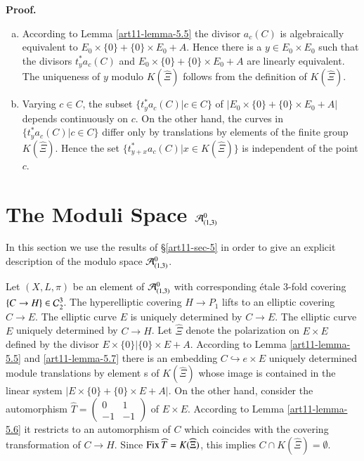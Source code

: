 \medskip
\noindent
{\bfseries Proof.}

\begin{enumerate}[a)]
\item According to Lemma \ref{art11-lemma-5.5} the divisor $a_{c}(C)$ is algebraically equivalent to $E_{0} \times \{0\} + \{0\} \times E_{0} + A$. Hence there is a $y \in E_{0} \times E_{0}$ such that the divisors $t_{y}^{*}a_{c}(C)$ and $E_{0} \times \{0\} + \{0\} \times E_{0} +A$ are linearly equivalent. The uniqueness of $y$ modulo $K(\widehat{\Xi})$ follows from the definition of $K(\widehat{\Xi})$.

\item Varying $c \in C$, the subset $\{t_{y}^{*}a_{c}(C) | c\in C\}$ of $|E_{0} \times \{0\} + \{0\} \times E_{0} +A|$
depends continuously on $c$. On the other hand, the curves in $\{t_{y}^{*}a_{c}(C)| c \in C\}$ differ only by translations by elements of the finite group $K(\widehat{\Xi})$. Hence the set $\{t_{y+x}^{*}a_{c}(C) | x \in K(\widehat{\Xi})\}$ is independent of the point $c$.
\end{enumerate}

\section{The Moduli Space $\mathcal{A}^{0}_{(1,3)}$}\label{art11-sec-6}

In this section we use the results of \S\ref{art11-sec-5} in order to give an explicit description of the modulo space $\mathcal{A}_{(1,3)}^{0}$. 

Let $(X, L, \pi)$ be an element of $\mathcal{A}_{(1,3)}^{0}$ with corresponding \'etale 3-fold covering $\{ C \rightarrow H \} \in \mathcal{C}_{2}^{3}$. The hyperelliptic covering $H \rightarrow P_{1}$ lifts to an elliptic covering $C \rightarrow E$. The elliptic curve $E$ is uniquely determined by $C\rightarrow E$. The elliptic curve $E$ uniquely determined by $C\rightarrow H$. Let $\widehat{\Xi}$ denote the polarization on $E \times E$ defined by the divisor $E \times \{0\} |\{0\} \times E +A $. According to Lemma \ref{art11-lemma-5.5} and \ref{art11-lemma-5.7} there is an embedding $C \hookrightarrow e \times E$ uniquely determined module translations by element s of $K(\widehat{\Xi})$ whose image is contained in the linear system $|E \times \{0\}+ \{0\} \times E + A|$. On the other hand, consider the automorphism $\widehat{T}=\begin{pmatrix}
0 & 1\\
-1 & -1
\end{pmatrix}$ of $E \times E$. According to Lemma \ref{art11-lemma-5.6} it restricts to an automorphism of $C$ which coincides with the covering transformation of $C\rightarrow H$. Since $\operatorname{Fix}\widehat{T} =K(\widehat{\Xi})$, this implies $C \cap K(\widehat{\Xi})=\emptyset$.

